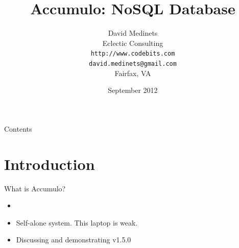 \documentclass[t,landscape]{beamer}
\title[Accumulo]{Accumulo: NoSQL Database}
\author[]{David Medinets\\Eclectic Consulting\\ \texttt{http://www.codebits.com} \\ \texttt{david.medinets@gmail.com} \\ Fairfax, VA}
\institute{XLDB 2012}
\date{September 2012}
\begin{document}

\begin{frame}
\titlepage
\end{frame}

\begin{frame}{Contents}
\tableofcontents
\end{frame}

\section{Introduction}
\begin{frame}{What is Accumulo?}
\begin{itemize}
\item{}
\item{Self-alone system. This laptop is weak.}
\item{Discussing and demonstrating v1.5.0}
\end{itemize}
\end{frame}
\end{document}
